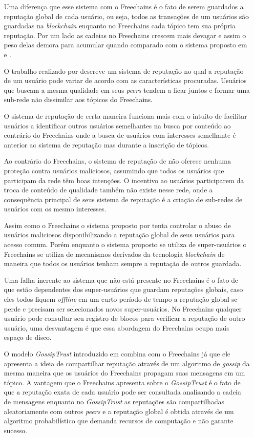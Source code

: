 \documentclass[12pt]{article}
\newcommand{\FC} {Freechains\xspace}
\begin{document}
Uma diferença que esse sistema com o \FC é o fato de serem guardados a reputação global de cada usuário, ou seja, todos as transações de um usuários são guardadas na \emph{blockchain} enquanto no \FC cada tópico tem sua própria reputação. Por um lado as cadeias no \FC crescem mais devagar e assim o peso delas demora para acumular quando comparado com o sistema proposto em \cite{dennis2015rep} e \cite{dennis2016rep}.

O trabalho realizado por \cite{1231515} descreve um sistema de reputação no qual a reputação de um usuário pode variar de acordo com as características procuradas. Usuários que buscam a mesma qualidade em seus \emph{peers} tendem a ficar juntos e formar uma sub-rede não dissimilar aos tópicos do \FC. 

O sistema de reputação de certa maneira funciona mais com o intuito de facilitar usuários a identificar outros usuários semelhantes na busca por conteúdo ao contrário do \FC onde a busca de usuários com interesses semelhante é anterior ao sistema de reputação mas durante a inscrição de tópicos.

Ao contrário do \FC, o sistema de reputação de \cite{1231515} não oferece nenhuma proteção contra usuários maliciosos, assumindo que todos os usuários que participam da rede têm boas intenções. O incentivo ao usuários participarem da troca de conteúdo de qualidade também não existe nesse rede, onde a consequência principal de seus sistema de reputação é a criação de sub-redes de usuários com os mesmo interesses.

Assim como o \FC o sistema proposto por \cite{zhou2007powertrust} tenta controlar o abuso de usuários maliciosos disponibilizando a reputação global de seus usuários para acesso comum. Porém enquanto o sistema proposto se utiliza de super-usuários o \FC se utiliza de mecanismos derivados da tecnologia \emph{blockchain} de maneira que todos os usuários tenham sempre a reputação de outros guardada. 

Uma falha inerente ao sistema que não está presente no \FC é o fato de que estão dependentes dos super-usuários que guardam reputações globais, caso eles todos fiquem \emph{offline} em um curto período de tempo a reputação global se perde e precisam ser selecionados novos super-usuários. No \FC qualquer usuário pode consultar seu registro de blocos para verificar a reputação de outro usuário, uma desvantagem é que essa abordagem do \FC ocupa mais espaço de disco.

O modelo \emph{GossipTrust} introduzido em \cite{zhou2007gossip} combina com o \FC já que ele apresenta a ideia de compartilhar reputação através de um algoritmo de \emph{gossip} da mesma maneira que os usuários do \FC propagam suas mensagens em um tópico. A vantagem que o \FC apresenta sobre o \emph{GossipTrust} é o fato de que a reputação exata de cada usuário pode ser consultada analisando a cadeia de mensagens enquanto no \emph{GossipTrust} as reputações são compartilhadas aleatoriamente com outros \emph{peers} e a reputação global é obtida através de um algoritmo probabilístico que demanda recursos de computação e não garante sucesso. 
\end{document}
